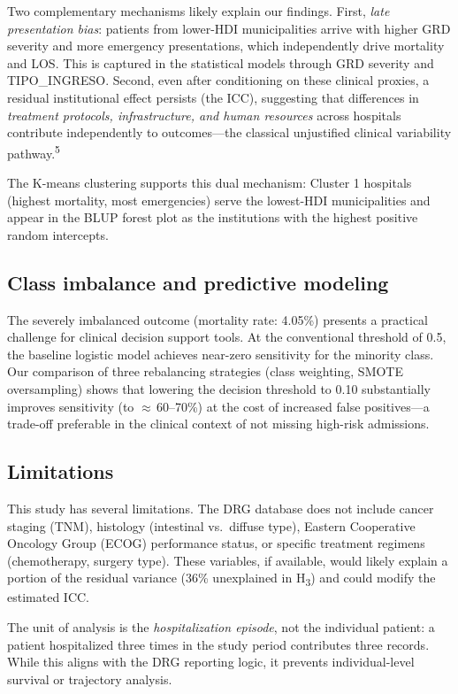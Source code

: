 \documentclass[10pt,twocolumn]{article}
\begin{document}
Two complementary mechanisms likely explain our findings. First, \textit{late
presentation bias}: patients from lower-HDI municipalities arrive with higher GRD
severity and more emergency presentations, which independently drive mortality and
LOS. This is captured in the statistical models through GRD severity and TIPO\_INGRESO.
Second, even after conditioning on these clinical proxies, a residual institutional
effect persists (the ICC), suggesting that differences in \textit{treatment protocols,
infrastructure, and human resources} across hospitals contribute independently to
outcomes—the classical unjustified clinical variability pathway.\textsuperscript{5}

The K-means clustering supports this dual mechanism: Cluster 1 hospitals (highest
mortality, most emergencies) serve the lowest-HDI municipalities and appear in the
BLUP forest plot as the institutions with the highest positive random intercepts.

\subsection{Class imbalance and predictive modeling}

The severely imbalanced outcome (mortality rate: 4{.}05\%) presents a practical
challenge for clinical decision support tools. At the conventional threshold of 0.5,
the baseline logistic model achieves near-zero sensitivity for the minority class. Our
comparison of three rebalancing strategies (class weighting, SMOTE oversampling) shows
that lowering the decision threshold to 0.10 substantially improves sensitivity (to
$\approx$\,60–70\%) at the cost of increased false positives—a trade-off preferable
in the clinical context of not missing high-risk admissions.

\subsection{Limitations}

This study has several limitations. The DRG database does not include cancer staging
(TNM), histology (intestinal vs.\ diffuse type), Eastern Cooperative Oncology Group
(ECOG) performance status, or specific treatment regimens (chemotherapy, surgery type).
These variables, if available, would likely explain a portion of the residual variance
(36\% unexplained in H\textsubscript{3}) and could modify the estimated ICC.

The unit of analysis is the \textit{hospitalization episode}, not the individual
patient: a patient hospitalized three times in the study period contributes three
records. While this aligns with the DRG reporting logic, it prevents individual-level
survival or trajectory analysis.
\end{document}
